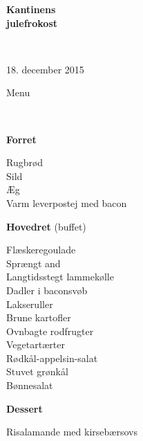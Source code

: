 \begin{center}
\begin{HUGE}
\textbf{Kantinens \\[3mm] julefrokost}
\end{HUGE}
\\[.6cm]
\begin{Large}
18. december 2015
\end{Large}
\end{center}
\vspace*{.01cm}
\begin{center}
\begin{huge}
Menu
\end{huge}
\\[.1cm]
\end{center}
\newcommand{\course}[1]{\vspace*{4mm} \textbf{#1} \vspace{-7mm}}
\newcommand{\goodindent}{\null\hspace{23mm}}
{\small
\begin{center}
\course{Forret}
\end{center}
  \goodindent Rugbrød
\\\goodindent Sild
\\\goodindent Æg
\\\goodindent Varm leverpostej med bacon

\begin{center}
\course{Hovedret} (buffet)
\end{center}
  \goodindent Flæskeregoulade
\\\goodindent Sprængt and
\\\goodindent Langtidsstegt lammekølle
\\\goodindent Dadler i baconsvøb
\\\goodindent Lakseruller
\\\goodindent Brune kartofler
\\\goodindent Ovnbagte rodfrugter
\\\goodindent Vegetartærter
\\\goodindent Rødkål-appelsin-salat
\\\goodindent Stuvet grønkål
\\\goodindent Bønnesalat

\begin{center}
\course{Dessert}
\end{center}
  \goodindent Risalamande med kirsebærsovs
}
